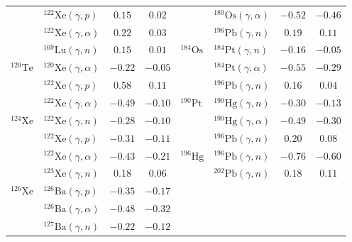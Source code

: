\begin{table}
\begin{tabular}{llcc|llcc}
    $ $ & $^{122}\mathrm{Xe}(\gamma,p)$ & $0.15$ & $0.02$ & $ $ & $^{180}\mathrm{Os}(\gamma,\alpha)$ & $-0.52$ & $-0.46$ \\ 
    $ $ & $^{122}\mathrm{Xe}(\gamma,\alpha)$ & $0.22$ & $0.03$ & $ $ & $^{196}\mathrm{Pb}(\gamma,n)$ & $0.19$ & $0.11$ \\ 
    $ $ & $^{169}\mathrm{Lu}(\gamma,n)$ & $0.15$ & $0.01$ & $^{184}\mathrm{Os}$ & $^{184}\mathrm{Pt}(\gamma,n)$ & $-0.16$ & $-0.05$ \\ 
    $^{120}\mathrm{Te}$ & $^{120}\mathrm{Xe}(\gamma,\alpha)$ & $-0.22$ & $-0.05$ & $ $ & $^{184}\mathrm{Pt}(\gamma,\alpha)$ & $-0.55$ & $-0.29$ \\ 
    $ $ & $^{122}\mathrm{Xe}(\gamma,p)$ & $0.58$ & $0.11$ & $ $ & $^{196}\mathrm{Pb}(\gamma,n)$ & $0.16$ & $0.04$ \\ 
    $ $ & $^{122}\mathrm{Xe}(\gamma,\alpha)$ & $-0.49$ & $-0.10$ & $^{190}\mathrm{Pt}$ & $^{190}\mathrm{Hg}(\gamma,n)$ & $-0.30$ & $-0.13$ \\ 
    $^{124}\mathrm{Xe}$ & $^{122}\mathrm{Xe}(\gamma,n)$ & $-0.28$ & $-0.10$ & $ $ & $^{190}\mathrm{Hg}(\gamma,\alpha)$ & $-0.49$ & $-0.30$ \\ 
    $ $ & $^{122}\mathrm{Xe}(\gamma,p)$ & $-0.31$ & $-0.11$ & $ $ & $^{196}\mathrm{Pb}(\gamma,n)$ & $0.20$ & $0.08$ \\ 
    $ $ & $^{122}\mathrm{Xe}(\gamma,\alpha)$ & $-0.43$ & $-0.21$ & $^{196}\mathrm{Hg}$ & $^{196}\mathrm{Pb}(\gamma,n)$ & $-0.76$ & $-0.60$ \\ 
    $ $ & $^{123}\mathrm{Xe}(\gamma,n)$ & $0.18$ & $0.06$ & $ $ & $^{202}\mathrm{Pb}(\gamma,n)$ & $0.18$ & $0.11$ \\ 
    $^{126}\mathrm{Xe}$ & $^{126}\mathrm{Ba}(\gamma,p)$ & $-0.35$ & $-0.17$ & $ $ & $ $ &  &  \\ 
    $ $ & $^{126}\mathrm{Ba}(\gamma,\alpha)$ & $-0.48$ & $-0.32$ & $ $ & $ $ &  &  \\ 
    $ $ & $^{127}\mathrm{Ba}(\gamma,n)$ & $-0.22$ & $-0.12$ & $ $ & $ $ &  &  \\ 
    \toprule
    \end{tabular}
\end{table}